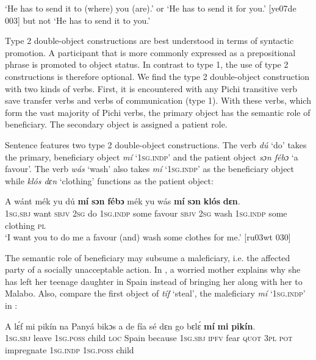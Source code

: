 \glt 
 ‘He has to send it to (where) you (are).’ or ‘He has to send it for you.’ [ye07de 003]
but not `He has to send it to you.' 
\z

Type 2 double-object constructions are best understood in terms of syntactic promotion. A participant that is more commonly expressed as a prepositional phrase is promoted to object status. In contrast to type 1, the use of type 2 constructions is therefore optional. We find the type 2 double-object construction with two kinds of verbs. First, it is encountered with any Pichi transitive verb save transfer verbs and verbs of communication (type 1). With these verbs, which form the vast majority of Pichi verbs, the primary object has the semantic role of beneficiary. The secondary object is assigned a patient role. 


Sentence  features two type 2 double-object constructions. The verb \textit{dú} ‘do’ takes the primary, beneficiary object \textit{mí} ‘\textsc{1sg.indp}’ and the patient object \textit{sɔn fébɔ} ‘a favour’.\textit{} The verb \textit{wás} ‘wash’ also takes \textit{mí} ‘\textsc{1sg.indp}’ as the beneficiary object while \textit{klós dɛn} ‘clothing’ functions as the patient object: 



\ea%
    \label{ex:key:1210}
    \gll A    wánt  mék    yu  dú  \textbf{mí}    \textbf{sɔn}   \textbf{fébɔ}    mék
yu  wás    \textbf{mí}    \textbf{sɔn}   \textbf{klós}    \textbf{dɛn}.\\
\textsc{1sg.sbj}  want  \textsc{sbjv}    \textsc{2sg}  do  \textsc{1sg.indp}  some  favour  \textsc{sbjv}
\textsc{2sg}  wash  \textsc{1sg.indp}  some  clothing  \textsc{pl}\\

\glt ‘I want you to do me a favour (and) wash some clothes for me.’ [ru03wt 030]
\z

The semantic role of beneficiary may subsume a maleficiary, i.e. the affected party of a socially unacceptable action. In , a worried mother explains why she has left her teenage daughter in Spain instead of bringing her along with her to Malabo. Also, compare the first object of \textit{tíf} ‘steal’, the maleficiary \textit{mí} ‘\textsc{1sg.indp}’ in :


\ea%
    \label{ex:key:1211}
    \gll A    lɛ́f    mi    pikín  na  Panyá  bikɔs  a    de  fía
sé    dɛn  go  bɛlɛ́      \textbf{mí}    \textbf{mi}  \textbf{pikín}.\\
\textsc{1sg.sbj}  leave  \textsc{1sg.poss}  child  \textsc{loc}  Spain  because  \textsc{1sg.sbj}  \textsc{ipfv}  fear
\textsc{quot}    \textsc{3pl}  \textsc{pot}  impregnate  \textsc{1sg.indp}  \textsc{1sg.poss}  child\\

